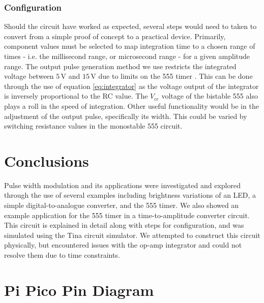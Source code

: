 \documentclass[%
 reprint,
 amsmath,amssymb,
 aps,
]{revtex4-2}
\begin{document}
        \subsubsection{Configuration}
        Should the circuit have worked as expected, several steps would need to taken to convert from a simple proof of concept to a practical device. Primarily, component values must be selected to map integration time to a chosen range of times - i.e. the millisecond range, or microsecond range - for a given amplitude range. The output pulse generation method we use restricts the integrated voltage between $5\,\text{V}$ and $15\,\text{V}$ due to limits on the 555 timer \cite{555Modes}. This can be done through the use of equation \ref{eq:integrator} as the voltage output of the integrator is inversely proportional to the RC value. The $V_\text{cc}$ voltage of the bistable 555 also plays a roll in the speed of integration. Other useful functionality would be in the adjustment of the output pulse, specifically its width. This could be varied by switching resistance values in the monostable 555 circuit.\\

\section{Conclusions}

Pulse width modulation and its applications were investigated and explored through the use of several examples including brightness variations of an LED, a simple digital-to-analogue converter, and the 555 timer. We also showed an example application for the 555 timer in a time-to-amplitude converter circuit. This circuit is explained in detail along with steps for configuration, and was simulated using the Tina circuit simulator. We attempted to construct this circuit physically, but encountered issues with the op-amp integrator and could not resolve them due to time constraints.
    



\clearpage
\onecolumngrid
\appendix

\section{Pi Pico Pin Diagram}
\end{document}
